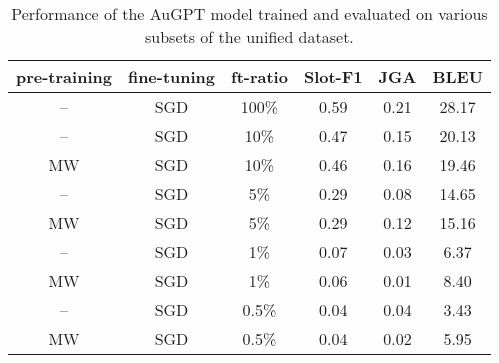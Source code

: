 \begin{table*}[tp]
    \centering \small
    \begin{tabular}{cccccc}
      \toprule
       pre-training & fine-tuning & ft-ratio & \textbf{Slot-F1} & \textbf{JGA} & \textbf{BLEU} \\
        \midrule
       -- & SGD & 100\% & 0.59 & 0.21 & 28.17 \\
       -- & SGD & 10\% & 0.47 & 0.15 & 20.13 \\
       MW & SGD & 10\% & 0.46 & 0.16 & 19.46 \\
       -- & SGD & 5\% & 0.29 & 0.08 & 14.65 \\
       MW & SGD & 5\% & 0.29 & 0.12 & 15.16 \\
       -- & SGD & 1\% & 0.07 & 0.03 & 6.37\\
       MW & SGD & 1\% & 0.06 & 0.01 & 8.40 \\
       -- & SGD & 0.5\% & 0.04 & 0.04 & 3.43 \\
       MW & SGD & 0.5\% & 0.04 & 0.02 & 5.95 \\
       \midrule
      \bottomrule
  \end{tabular}
  \caption{Performance of the AuGPT model trained and evaluated on various subsets of the unified dataset.}
  \label{tab:exp-results-seed}
\end{table*}